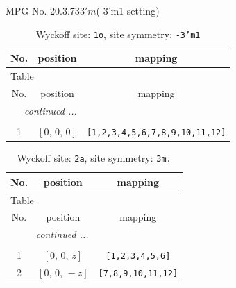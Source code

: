 \documentclass[fleqn,8pt]{jsarticle}
\begin{document}
\setcounter{MaxMatrixCols}{32}

\renewcommand{\tablename}{Table~}
\renewcommand{\figurename}{Figure~}
\begin{center}
\LARGE
MPG No. 20.3.73\quad$\bar{3}'m$\quad(-3'm1 setting)
\end{center}
\renewcommand{\arraystretch}{1.2}
\begin{longtable}{ccc}
\caption{Wyckoff site: {\tt 1o}, site symmetry: {\tt -3'm1}}
 \\
 \hline \hline
No. & position & mapping \\ \hline \endfirsthead

\multicolumn{2}{l}{\tablename\ \thetable{}} \\
 \hline \hline
No. & position & mapping \\ \hline \endhead

 \hline \hline
\multicolumn{2}{r}{\footnotesize\it continued ...} \\ \endfoot

 \hline \hline
\multicolumn{2}{r}{} \\ \endlastfoot

1 & $\left[ 0,\, 0,\, 0 \right]$ & {\tt [1,2,3,4,5,6,7,8,9,10,11,12]} \\
\end{longtable}
\renewcommand{\arraystretch}{1.2}
\begin{longtable}{ccc}
\caption{Wyckoff site: {\tt 2a}, site symmetry: {\tt 3m.}}
 \\
 \hline \hline
No. & position & mapping \\ \hline \endfirsthead

\multicolumn{2}{l}{\tablename\ \thetable{}} \\
 \hline \hline
No. & position & mapping \\ \hline \endhead

 \hline \hline
\multicolumn{2}{r}{\footnotesize\it continued ...} \\ \endfoot

 \hline \hline
\multicolumn{2}{r}{} \\ \endlastfoot

1 & $\left[ 0,\, 0,\, z \right]$ & {\tt [1,2,3,4,5,6]} \\ \hline
2 & $\left[ 0,\, 0,\, - z \right]$ & {\tt [7,8,9,10,11,12]} \\
\end{longtable}
\renewcommand{\arraystretch}{1.2}
\end{document}
